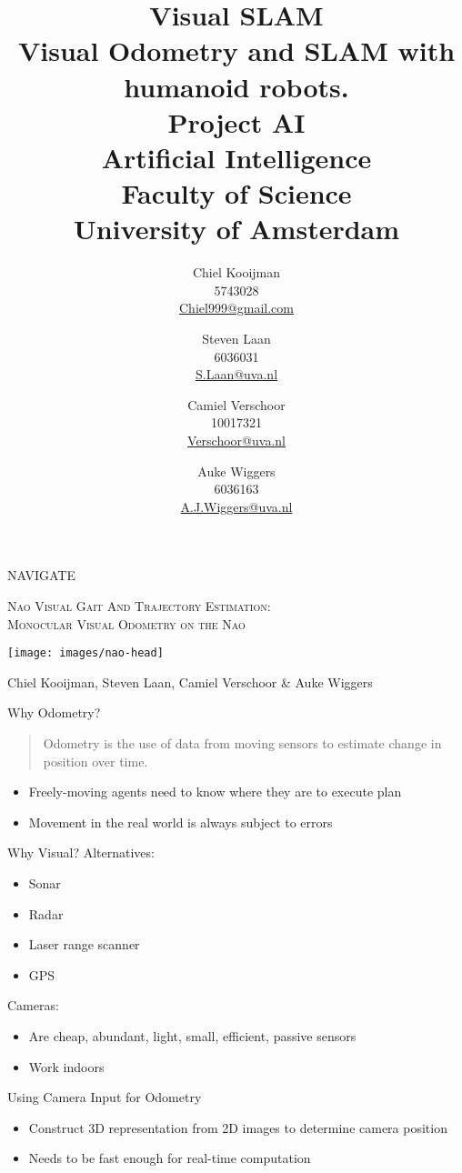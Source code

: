 \documentclass{beamer}
\author{Chiel Kooijman\\5743028\\\url{Chiel999@gmail.com} \and
Steven Laan\\6036031\\\url{S.Laan@uva.nl} \and
Camiel Verschoor\\10017321\\\url{Verschoor@uva.nl} \and
Auke Wiggers\\6036163\\\url{A.J.Wiggers@uva.nl}}
\title{Visual SLAM\\ \normalsize Visual Odometry and SLAM with humanoid
robots.\\Project AI\\Artificial Intelligence\\Faculty of Science\\ University
of Amsterdam}
\begin{document}
\begin{frame}
	\begin{center}
		{\LARGE NAVIGATE}
	\end{center}

	\begin{center}
		\textsc{Nao Visual Gait And Trajectory Estimation:}\\
		\textsc{\small Monocular Visual Odometry on the Nao}
	\end{center}

	\begin{center}
		\texttt{[image: images/nao-head]}
	\end{center}

	\begin{center}
		Chiel Kooijman, Steven Laan, Camiel Verschoor \& Auke Wiggers
	\end{center}
\end{frame}

\begin{frame}{Why Odometry?}
	\begin{quote}
		Odometry is the use of data from moving sensors to estimate change in
		position over time.
	\end{quote}

	\begin{itemize}
		\item Freely-moving agents need to know where they are to execute plan
		\item Movement in the real world is always subject to errors
	\end{itemize}
\end{frame}

\begin{frame}{Why Visual?}
	Alternatives:
	\begin{itemize}
		\item Sonar
		\item Radar
		\item Laser range scanner
		\item GPS
	\end{itemize}

	Cameras:
	\begin{itemize}
		\item Are cheap, abundant, light, small, efficient, passive sensors
		\item	Work indoors
	\end{itemize}
\end{frame}

\begin{frame}{Using Camera Input for Odometry}
	\begin{itemize}
		\item Construct 3D representation from 2D images to determine camera
			position
		\item Needs to be fast enough for real-time computation
	\end{itemize}
\end{frame}
\end{document}
